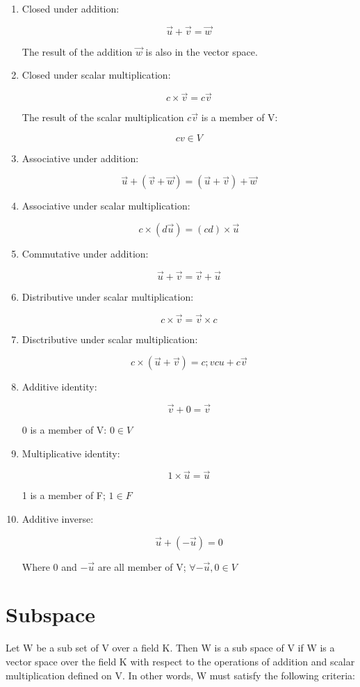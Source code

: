 \documentclass{book}
\begin{document}
\begin{enumerate}
	\item Closed under addition:

		\[\vec u + \vec v = \vec w\]

		The result of the addition \(\vec w\) is also in the vector space.

	\item Closed under scalar multiplication:

		\[c \times \vec v = c \vec v\]

		The result of the scalar multiplication \(c \vec v\) is a member of V:

		\[cv \in V\]

	\item Associative under addition:

		\[\vec u + (\vec v + \vec w) = (\vec u + \vec v) + \vec w\]
	\item Associative under scalar multiplication:

		\[c \times (d \vec u) = (cd) \times \vec u\]
	\item Commutative under addition:

		\[\vec u + \vec v = \vec v + \vec u\]
	\item Distributive under scalar multiplication:

		\[c \times \vec v = \vec v \times c\]

	\item Disctributive under scalar multiplication:

		\[c \times (\vec u + \vec v) = c ;vc u + c \vec v\]

	\item Additive identity:

		\[\vec v + 0 = \vec v\]

		0 is a member of V: \(0 \in V\)
	\item Multiplicative identity:

		\[1 \times \vec u = \vec u\]

		1 is a member of F; \(1 \in F\)

	\item Additive inverse:

		\[\vec u + (- \vec u) = 0\]

		Where 0 and \(- \vec u\) are all member of V; \(\forall - \vec u, 0 \in V\)
\end{enumerate}

\section{Subspace}
Let W be a sub set of V over a field K. Then W is a sub space of V if W is a vector space over the field K with respect to the operations of addition and scalar multiplication defined on V. In other words, W must satisfy the following criteria:
\end{document}
